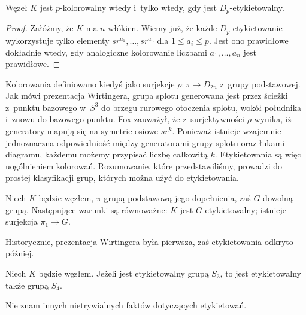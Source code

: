 \begin{proposition}
    Węzeł $K$ jest $p$-kolorowalny wtedy i~tylko wtedy, gdy jest $D_p$-etykietowalny.
\end{proposition}

\begin{proof}
    Załóżmy, że $K$ ma $n$ włókien.
    Wiemy już, że każde $D_p$-etykietowanie wykorzystuje tylko elementy $sr^{a_1}, \ldots, sr^{a_n}$ dla $1 \le a_i \le p$.
    Jest ono prawidłowe dokładnie wtedy, gdy analogiczne kolorowanie liczbami $a_1, \ldots, a_n$ jest prawidłowe.
\end{proof}

Kolorowania definiowano kiedyś jako surjekcje $\rho \colon \pi \to D_{2n}$ z~grupy podstawowej.
Jak mówi prezentacja Wirtingera, grupa splotu generowana jest przez ścieżki z~punktu bazowego w~$S^3$ do brzegu rurowego otoczenia splotu, wokół południka i~znowu do bazowego punktu.
%
Fox zauważył, że z~surjektywności $\rho$ wynika, iż generatory mapują się na symetrie osiowe $sr^k$.
Ponieważ istnieje wzajemnie jednoznaczna odpowiedniość między generatorami grupy splotu oraz łukami diagramu, każdemu możemy przypisać liczbę całkowitą $k$.
Etykietowania są więc uogólnieniem kolorowań.
Rozumowanie, które przedstawiliśmy, prowadzi do prostej klasyfikacji grup, których można użyć do etykietowania.

\begin{proposition}
    Niech $K$ będzie węzłem, $\pi$ grupą podstawową jego dopełnienia, zaś $G$ dowolną grupą.
    Następujące warunki są równoważne: $K$ jest $G$-etykietowalny; istnieje surjekcja $\pi_1 \to G$.
\end{proposition}

Historycznie, prezentacja Wirtingera była pierwsza, zaś etykietowania odkryto później.

\begin{proposition}[Perko]
    Niech $K$ będzie węzłem.
    Jeżeli jest etykietowalny grupą $S_3$, to jest etykietowalny także grupą $S_4$.
\end{proposition}

Nie znam innych nietrywialnych faktów dotyczących etykietowań.


